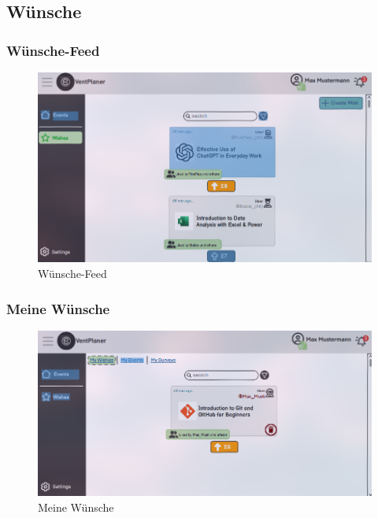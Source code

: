 \documentclass[a4paper,12pt]{article}
\begin{document}
\subsection{Wünsche}
\subsubsection{Wünsche-Feed}
\begin{figure}[H]
    \centering
    \includegraphics[width=1\textwidth]{Abbildungen/wishes/wishes-feed.png}
    \caption{Wünsche-Feed}
    \label{fig:wishes-feed}
  \end{figure}
\subsubsection{Meine Wünsche}
\begin{figure}[H]
    \centering
    \includegraphics[width=1\textwidth]{Abbildungen/wishes/my-wishes.png}
    \caption{Meine Wünsche}
    \label{fig:my-wishes}
  \end{figure}
\end{document}
